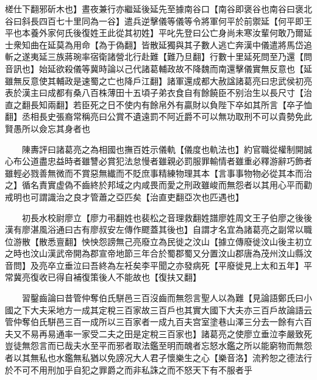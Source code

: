 槎仕下翻邪斫木也】晝夜兼行亦繼延後延先至據南谷口【南谷即褒谷也南谷曰褒北谷曰斜長四百七十里同為一谷】遣兵逆擊儀等儀等令將軍何平於前禦延【何平即王平也本養外家何氏後復姓王此從其初姓】平叱先登曰公亡身尚未寒汝輩何敢乃爾延士衆知曲在延莫為用命【為于偽翻】皆散延獨與其子數人逃亡奔漢中儀遣將馬岱追斬之遂夷延三族蔣琬率宿衛諸營北行赴難【難乃旦翻】行數十里延死問至乃還【問音訊也】始延欲殺儀等冀時論以己代諸葛輔政故不降魏而南還擊儀實無反意也【延雖無反意使其輔政是速蜀之亡也降戶江翻】諸軍還成都大赦諡諸葛亮曰忠武侯初亮表於漢主曰成都有桑八百株薄田十五頃子弟衣食自有餘饒臣不别治生以長尺寸【治直之翻長知兩翻】若臣死之日不使内有餘帛外有贏財以負陛下卒如其所言【卒子恤翻】丞相長史張裔常稱亮曰公賞不遺遠罰不阿近爵不可以無功取刑不可以貴勢免此賢愚所以僉忘其身者也

　　陳夀評曰諸葛亮之為相國也撫百姓示儀軌【儀度也軌法也】約官職從權制開誠心布公道盡忠益時者雖讐必賞犯法怠慢者雖親必罰服罪輸情者雖重必釋游辭巧飾者雖輕必戮善無微而不賞惡無纎而不貶庶事精練物理其本【言事事物物必從其本而治之】循名責實虚偽不齒終於邦域之内咸畏而愛之刑政雖峻而無怨者以其用心平而勸戒明也可謂識治之良才管蕭之亞匹矣【治直吏翻亞次也匹遇也】

　　初長水校尉廖立【廖力弔翻姓也裴松之音理救翻姓譜廖姓周文王子伯廖之後後漢有廖湛風浴通曰古有廖叔安左傳作飂蓋其後也】自謂才名宜為諸葛亮之副常以職位游散【散悉亶翻】怏怏怨謗無己亮廢立為民徙之汶山【據立傳廢徙汶山後主初立之時也汶山漢武帝開為郡宣帝地節三年合於蜀郡蜀又分置汶山郡唐為茂州汶山縣汶音問】及亮卒立垂泣曰吾終為左衽矣李平聞之亦發病死【平廢徙見上太和五年】平常冀亮復收已得自補復策後人不能故也【復扶又翻】

　　習鑿齒論曰昔管仲奪伯氏駢邑三百沒齒而無怨言聖人以為難【見論語鄭氏曰小國之下大夫采地方一成其定稅三百家故三百戶也其實大國下大夫亦三百戶故論語云管仲奪伯氏駢邑三百一成所以三百家者一成九百夫宫室塗巷山澤三分去一餘有六百夫又不易再易通率一家受二夫之田是定稅三百家也】諸葛亮之使廖立垂泣李嚴致死豈徒無怨言而已哉夫水至平而邪者取法鑑至明而醜者忘怒水鑑之所以能窮物而無怨者以其無私也水鑑無私猶以免謗况大人君子懷樂生之心【樂音洛】流矜恕之德法行於不可不用刑加乎自犯之罪爵之而非私誅之而不怒天下有不服者乎

